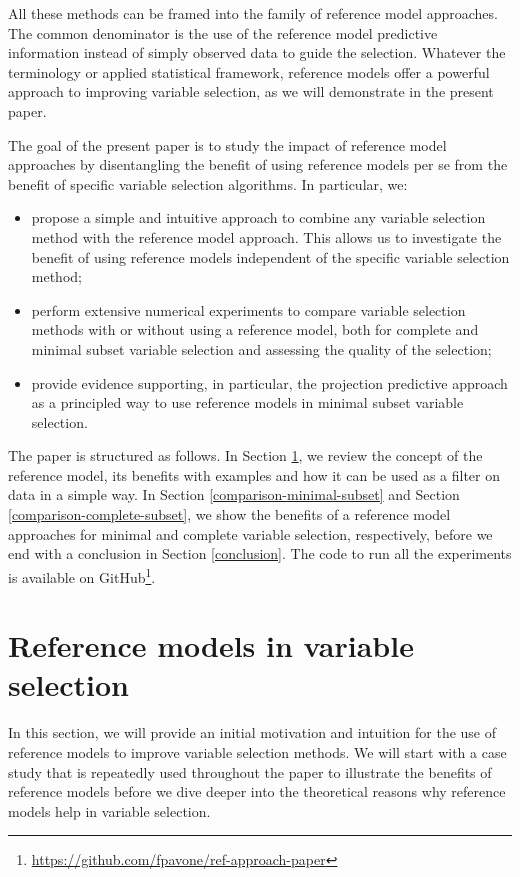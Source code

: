 \documentclass[a4]{article}
\let\rmarkdownfootnote\footnote%
\def\footnote{\protect\rmarkdownfootnote}
\theoremstyle{definition}
\begin{document}
All these methods can be framed into the family of reference model approaches. 
The common denominator is the use of the reference model predictive information 
instead of simply observed data to guide the selection.
Whatever the terminology or applied statistical framework, reference
models offer a powerful approach to improving variable selection, as we
will demonstrate in the present paper. 

The goal of the present paper is to study the impact of reference model approaches by disentangling the benefit of using reference models per se from the benefit of specific variable selection algorithms. In particular, we:
\begin{itemize}
	\item propose a simple and intuitive approach to combine any variable selection method with the reference model approach. This allows us to investigate the benefit of using reference models independent of the specific variable selection method;
	\item perform extensive numerical experiments to compare variable selection methods with or without using a reference model, both for complete and minimal subset variable selection and assessing the quality of the selection;
	\item provide evidence supporting, in particular, the projection predictive approach as a principled way to use reference models in minimal subset variable selection.
\end{itemize}

The paper is structured as follows. In Section
\ref{ref-intro}, we review the concept of the reference
model, its benefits with examples and how it can be used as a filter
on data in a simple way. In Section \ref{comparison-minimal-subset} and 
Section \ref{comparison-complete-subset}, we show the
benefits of a reference model approaches for minimal and complete 
variable selection, respectively, before we end with a conclusion in Section \ref{conclusion}.
The code to run all
the experiments is available on GitHub\footnote{\url{https://github.com/fpavone/ref-approach-paper}}.

\section{Reference models in variable selection}
\label{ref-intro}

In this section, we will provide an initial motivation and intuition 
for the use of reference models to improve variable selection methods.
We will start with a case study that is repeatedly used throughout
the paper to illustrate the benefits of reference models before we dive deeper
into the theoretical reasons why reference models help in variable selection.
\end{document}
